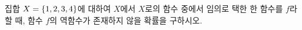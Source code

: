 집합 $X=\{1{,}\mkern3mu\mathopen{}2{,}\mkern3mu\mathopen{}3{,}\mkern3mu\mathopen{}4\}$에 대하여 $X$에서 $X$로의 함수 중에서 임의로 택한 한 함수를 $f$라 할 때, 함수 $f$의 역함수가 존재하지 않을 확률을 구하시오.

